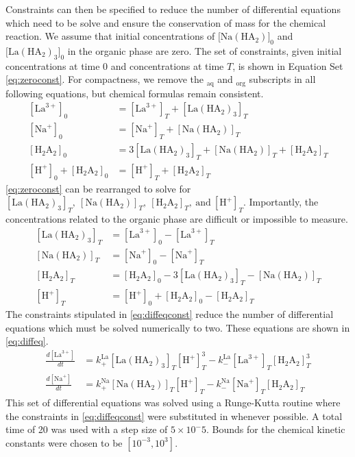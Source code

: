 \documentclass[
]{article}
\begin{document}
Constraints can then be specified to reduce the number of differential equations which need to be solve and ensure the conservation of mass for the chemical reaction. We assume that initial concentrations of \(\lbrack \mathrm{Na(HA_2)}\rbrack_0\) and \(\lbrack \mathrm{La(HA_2)_3}\rbrack_0\) in the organic phase are zero. The set of constraints, given initial concentrations at time 0 and concentrations at time \(T\), is shown in Equation Set \eqref{eq:zeroconst}. For compactness, we remove the \(_\mathrm{aq}\) and \(_\mathrm{org}\) subscripts in all following equations, but chemical formulas remain consistent.
\begin{equation}
\begin{split}
[ \mathrm{La}^{3+}]_0 &= [ \mathrm{La}^{3+}]_T + [\mathrm{La(HA_2)_3}]_T\\
[\mathrm{Na}^+]_0 &= [\mathrm{Na}^+]_T + [\mathrm{Na(HA_2)}]_T\\
[\mathrm{H_2A_2}]_0 &= 3[\mathrm{La(HA_2)_3}]_T + [\mathrm{Na(HA_2)}]_T + [\mathrm{H_2A_2}]_T\\
[\mathrm{H}^+]_0 + [\mathrm{H_2A_2}]_0 &= [\mathrm{H}^+]_T + [\mathrm{H_2A_2}]_T
\end{split}
\label{eq:zeroconst}
\end{equation}
\eqref{eq:zeroconst} can be rearranged to solve for \([\mathrm{La(HA_2)_3}]_T, \ [\mathrm{Na(HA_2)}]_T, \ [\mathrm{H_2A_2}]_T, \ \mathrm{and} \ [\mathrm{H}^+]_T\). Importantly, the concentrations related to the organic phase are difficult or impossible to measure.
\begin{equation}
\begin{split}
[\mathrm{La(HA_2)_3}]_T &= [\mathrm{La}^{3+}]_0 - [ \mathrm{La}^{3+}]_T\\
[\mathrm{Na(HA_2)}]_T &= [\mathrm{Na}^+]_0 - [\mathrm{Na}^+]_T\\
[\mathrm{H_2A_2}]_T &= [\mathrm{H_2A_2}]_0 -  3[\mathrm{La(HA_2)_3}]_T - [\mathrm{Na(HA_2)}]_T\\
[\mathrm{H}^+]_T  &= [\mathrm{H}^+]_0 + [\mathrm{H_2A_2}]_0 - [\mathrm{H_2A_2}]_T
\end{split}
\label{eq:diffeqconst}
\end{equation}
The constraints stipulated in \eqref{eq:diffeqconst} reduce the number of differential equations which must be solved numerically to two. These equations are shown in \eqref{eq:diffeq}.
\begin{equation}
\begin{split}
\frac{d[\mathrm{La}^{3+}]}{dt} &= k_{+}^{\mathrm{La}}[\mathrm{La(HA_2)}_3]_T[\mathrm{H}^+]_T^3 - k_{-}^{\mathrm{La}}[\mathrm{La}^{3+}]_T[\mathrm{H_2A_2}]_T^3\\
\frac{d[\mathrm{Na}^{+}]}{dt} &= k_{+}^{\mathrm{Na}}[\mathrm{Na(HA_2)}]_T[\mathrm{H}^+]_T - k_{-}^{\mathrm{Na}}[\mathrm{Na}^{+}]_T[\mathrm{H_2A_2}]_T
\end{split}
\label{eq:diffeq}
\end{equation}
This set of differential equations was solved using a Runge-Kutta routine where the constraints in \eqref{eq:diffeqconst} were substituted in whenever possible. A total time of 20 was used with a step size of \(5 \times 10^-5\). Bounds for the chemical kinetic constants were chosen to be \(\left[10^{-3}, 10^3\right]\).
\end{document}

